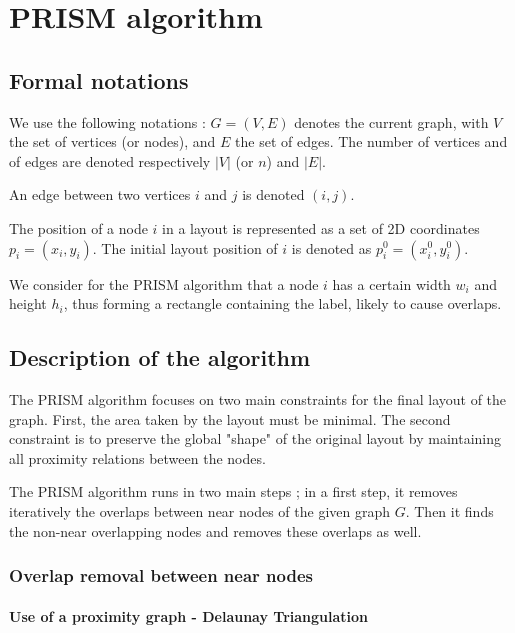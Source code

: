 \documentclass[12pt]{report}
\begin{document}



\chapter{PRISM algorithm}

\section{Formal notations}

We use the following notations : $G = (V,E)$ denotes the current graph, with $V$ the set of vertices (or nodes), and $E$ the set of edges. The number of vertices and of edges are denoted respectively $|V|$ (or $n$) and $|E|$.

An edge between two vertices $i$ and $j$ is denoted $(i,j)$.

The position of a node $i$ in a layout is represented as a set of 2D coordinates $p_i = (x_i, y_i)$. The initial layout position of $i$ is denoted as $p_i^0 = (x_i^0, y_i^0)$.

We consider for the PRISM algorithm that a node $i$ has a certain width $w_i$ and height $h_i$, thus forming a rectangle containing the label, likely to cause overlaps.

\section{Description of the algorithm}

The PRISM algorithm focuses on two main constraints for the final layout of the graph. First, the area taken by the layout must be minimal. The second constraint is to preserve the global "shape" of the original layout by maintaining all proximity relations between the nodes.

The PRISM algorithm runs in two main steps ; in a first step, it removes iteratively the overlaps between near nodes of the given graph $G$. Then it finds the non-near overlapping nodes and removes these overlaps as well.

\subsection{Overlap removal between near nodes}

\subsubsection{Use of a proximity graph - Delaunay Triangulation}
\end{document}
